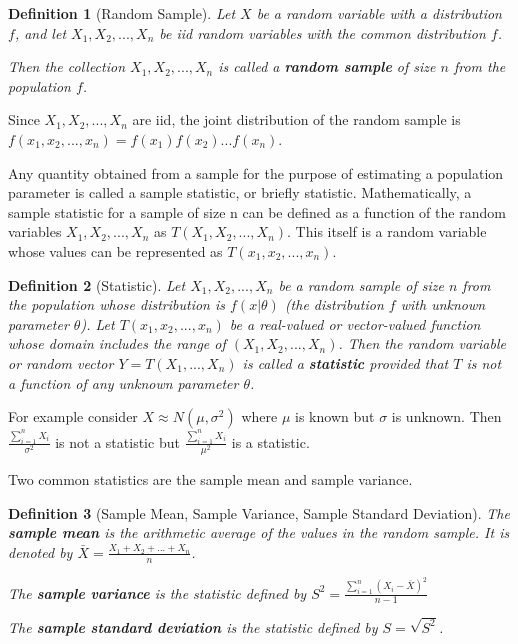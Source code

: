 \documentclass[12pt,twoside]{report}
\newtheorem{defn}{Definition}
\begin{document}
\begin{defn}[Random Sample]
Let $X$ be a random variable with a distribution $f$, and let $X_1, X_2, ..., X_n$ be iid random variables with the common distribution $f$.

Then the collection $X_1, X_2, ..., X_n$ is called a \textbf{random sample} of size $n$ from the population $f$.
\end{defn}

Since $X_1, X_2, ..., X_n$ are iid, the joint distribution of the random sample is $f(x_1, x_2, ..., x_n) = f(x_1) f(x_2) ... f(x_n)$.

Any quantity obtained from a sample for the purpose of estimating a population parameter is called a sample
statistic, or briefly statistic. Mathematically, a sample statistic for a sample of size n can be defined as a function of the random variables $X_1, X_2, ..., X_n$ as $T(X_1, X_2, ..., X_n)$. This itself is a random variable whose values can be represented as $T(x_1, x_2, ..., x_n)$.

\begin{defn}[Statistic]
    Let $X_1, X_2, ..., X_n$ be a random sample of size $n$ from the population whose distribution is $f\left (x|\theta\right )$ (the distribution $f$ with unknown parameter $\theta$). Let $T\left (x_1, x_2, ...,x_n\right )$ be a real-valued or vector-valued function whose domain includes the range of $\left (X_1, X_2, ..., X_n\right )$. Then the random variable or random vector $Y = T\left (X_1, ..., X_n\right )$ is called a \textbf{statistic} provided that $T$ is not a function of any unknown parameter $\theta$.
\end{defn}

For example consider $X \approx N(\mu, \sigma^2)$ where $\mu$ is known but $\sigma$ is unknown. Then $\frac{\sum_{i=1}^n X_i}{\sigma^2}$ is not a statistic but $\frac{\sum_{i=1}^n X_i}{\mu^2}$ is a statistic.

Two common statistics are the sample mean and sample variance.

\begin{defn}[Sample Mean, Sample Variance, Sample Standard Deviation]
    The \textbf{sample mean} is the arithmetic average of the values in the random sample. It is denoted by $\bar{X} = \displaystyle \frac{X_1 + X_2 + ... + X_n}{n}$.

    The \textbf{sample variance} is the statistic defined by $S^2 = \displaystyle \frac{\sum_{i=1}^n \left (X_i - \bar{X}\right )^2}{n-1}$

    The \textbf{sample standard deviation} is the statistic defined by $S = \sqrt{S^2}$.
\end{defn}
\end{document}
